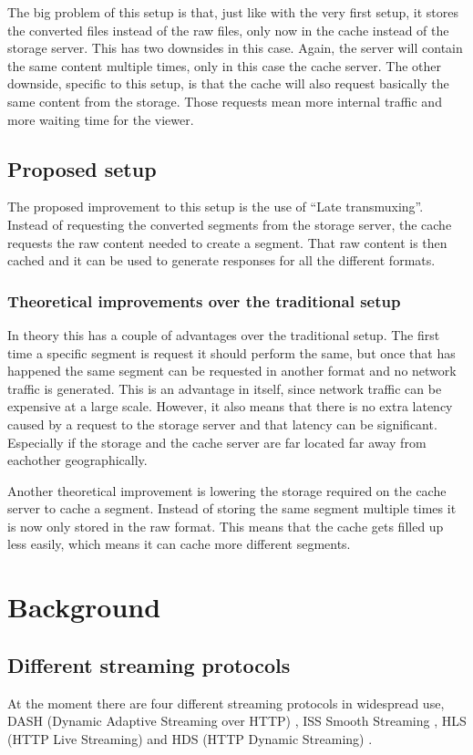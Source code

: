 \documentclass[twoside,openright]{uva-bachelor-thesis}
\begin{document}
The big problem of this setup is that, just like with the very first setup, it
stores the converted files instead of the raw files, only now in the cache
instead of the storage server. This has two downsides in this case. Again, the
server will contain the same content multiple times, only in this case the cache
server. The other downside, specific to this setup, is that the cache will also
request basically the same content from the storage. Those requests mean more
internal traffic and more waiting time for the viewer.

\section{Proposed setup}
The proposed improvement to this setup is the use of ``Late transmuxing''.
Instead of requesting the converted segments from the storage server, the cache
requests the raw content needed to create a segment. That raw content is then
cached and it can be used to generate responses for all the different formats.

\subsection{Theoretical improvements over the traditional setup}
In theory this has a couple of advantages over the traditional setup. The first
time a specific segment is request it should perform the same, but once that has
happened the same segment can be requested in another format and no network
traffic is generated. This is an advantage in itself, since network traffic can
be expensive at a large scale. However, it also means that there is no extra
latency caused by a request to the storage server and that latency can be
significant. Especially if the storage and the cache server are far located far
away from eachother geographically.

Another theoretical improvement is lowering the storage required on the cache
server to cache a segment. Instead of storing the same segment multiple times it
is now only stored in the raw format. This means that the cache gets filled up
less easily, which means it can cache more different segments.

\chapter{Background}
\section{Different streaming protocols}
At the moment there are four different streaming protocols in widespread use,
DASH (Dynamic Adaptive Streaming over HTTP) \autocite{dash}, ISS Smooth
Streaming \autocite{smooth}, HLS (HTTP Live Streaming) \autocite{hls} and HDS
(HTTP Dynamic Streaming) \autocite{hds}.
\end{document}
